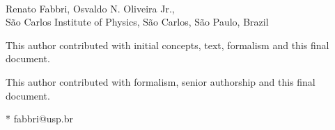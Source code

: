 \documentclass[10pt,letterpaper]{article}
\date{}
\begin{document}
\vspace*{0.2in}

\begin{flushleft}
{\Large
\textbf{} %
}
\newline
\\
Renato Fabbri\textsuperscript{\Yinyang*},
Osvaldo N. Oliveira Jr.\textsuperscript{\ddag},
\\
\bigskip
São Carlos Institute of Physics, São Carlos, São Paulo, Brazil
\bigskip

% 
%
\Yinyang This author contributed with initial concepts, text, formalism and this final document.

\ddag This author contributed with formalism, senior authorship and this final document.




* fabbri@usp.br

\end{flushleft}
\end{document}

